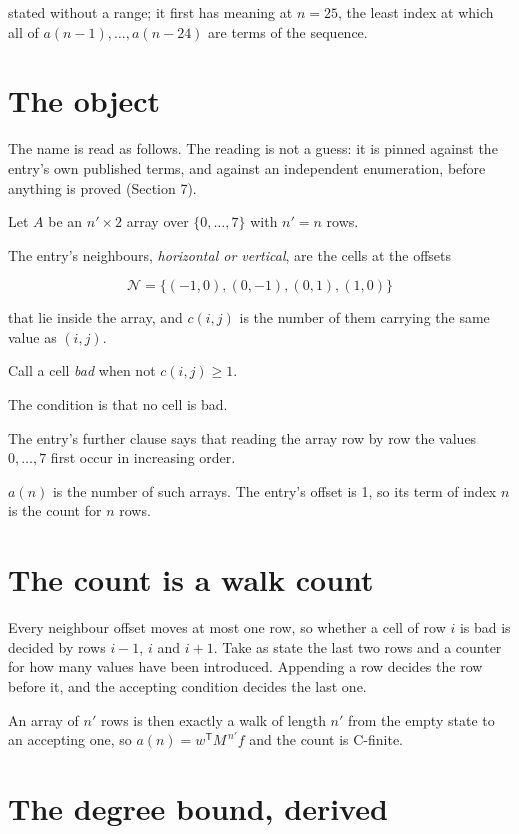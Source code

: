 \documentclass[11pt]{article}
\theoremstyle{definition}
\begin{document}
stated without a range; it first has meaning at $n = 25$, the least index at which all of $a(n-1),\dots,a(n-24)$ are terms of the sequence.

\section{The object}

The name is read as follows. The reading is not a guess: it is pinned against the entry's own published terms, and against an independent enumeration, before anything is proved (Section 7).

Let $A$ be an $n' \times 2$ array over $\{0,\dots,7\}$ with $n' = n$ rows.

The entry's neighbours, {\itshape horizontal or vertical}, are the cells at the offsets

\[\mathcal{N} = \{(-1,0), (0,-1), (0,1), (1,0)\}\]

that lie inside the array, and $c(i,j)$ is the number of them carrying the same value as $(i,j)$.

Call a cell {\itshape bad} when not $c(i,j) \ge 1$.

The condition is that no cell is bad.

The entry's further clause says that reading the array row by row the values $0,\dots,7$ first occur in increasing order.

$a(n)$ is the number of such arrays. The entry's offset is 1, so its term of index $n$ is the count for $n$ rows.

\section{The count is a walk count}

Every neighbour offset moves at most one row, so whether a cell of row $i$ is bad is decided by rows $i-1$, $i$ and $i+1$. Take as state the last two rows and a counter for how many values have been introduced. Appending a row decides the row before it, and the accepting condition decides the last one.

An array of $n'$ rows is then exactly a walk of length $n'$ from the empty state to an accepting one, so $a(n) = w^{\mathsf T}M^{\,n'}f$ and the count is C-finite.

\section{The degree bound, derived}
\end{document}
